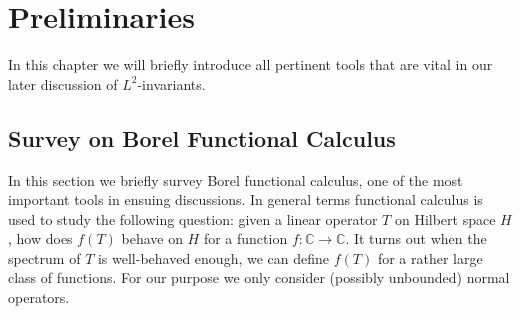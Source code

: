 \documentclass[11pt]{report}
\theoremstyle{definition}
\theoremstyle{plain}
\newcommand{\complex}{\mathbb{C}}
\begin{document}
\chapter{Preliminaries} \label{chapter1}
In this chapter we will briefly introduce all pertinent tools that are vital in our later discussion of $L^2$-invariants. 


\section{Survey on Borel Functional Calculus}
\par In this section we briefly survey Borel functional calculus, one of the most important tools in ensuing discussions. In general terms functional calculus is used to study the following question: given a linear operator $T$ on Hilbert space $H$, how does $f(T)$  behave on $H$ for a function $f:\complex \to \complex$. It turns out when the spectrum of $T$ is well-behaved enough, we can define $f(T)$ for a rather large class of functions. For our purpose we only consider (possibly unbounded) normal operators.
\end{document}

